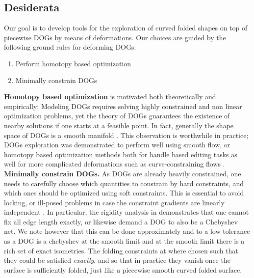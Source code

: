 \subsection{Desiderata}
Our goal is to develop tools for the exploration of curved folded shapes on top of piecewise DOGs by means of deformations. Our choices are guided by the following ground rules for deforming DOGs:
\begin{enumerate}
  \item Perform homotopy based optimization \label{homotopy_opt}
  \item Minimally constrain DOGs \label{minimal_const}
\end{enumerate}
\textbf{Homotopy based optimization} is motivated both theoretically and empirically; Modeling DOGs requires solving highly constrained and non linear optimization problems, yet the theory of DOGs guarantees the existence of nearby solutions if one starts at a feasible point. In fact, generally the shape space of DOGs is a smooth manifold \cite{rabi2018shape}. This observation is worthwhile in practice; DOGs exploration was demonstrated to perform well using smooth flow, or homotopy based optimization methods both for handle based editing tasks as well for more complicated deformations such as curve-constraining flows \cite{rabi2018shape}. \\
\textbf{Minimally constrain DOGs.} As DOGs are already heavily constrained, one needs to carefully choose which quantities to constrain by hard constraints, and which ones should be optimized using soft constraints. This is essential to avoid locking, or ill-posed problems in case the constraint gradients are linearly independent \cite{rabi2018shape}. In particular, the rigidity analysis in \cite{rabi18} demonstrates that one cannot fix all edge length exactly, or likewise demand a DOG to also be a Chebyshev net. We note however that this can be done approximately and to a low tolerance as a DOG is a chebyshev at the smooth limit and at the smooth limit there is a rich set of exact isometries. The folding constraints at  where chosen such that they could be satisfied \textit{exactly}, and so that in practice they vanish once the surface is sufficiently folded, just like a piecewise smooth curved folded surface. \\
